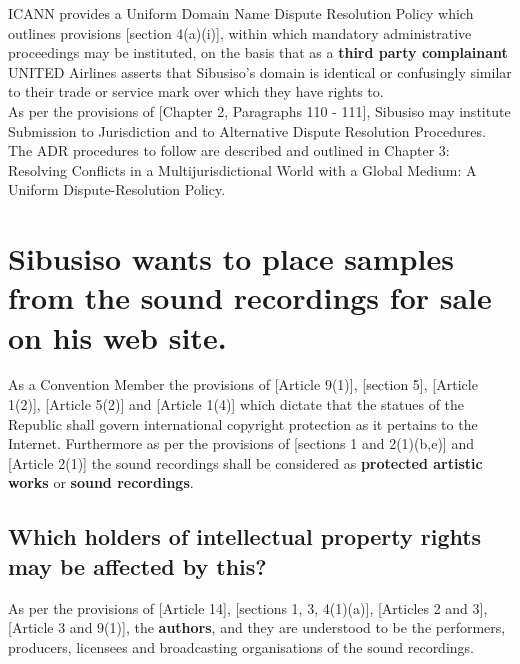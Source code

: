 \documentclass[11pt]{article}
\begin{document}
ICANN provides a Uniform Domain Name Dispute Resolution Policy which outlines
provisions [section 4(a)(i)]\cite{icann99_policy}, within which mandatory
administrative proceedings may be instituted, on the basis that as a \textbf{third
party complainant} UNITED Airlines asserts that Sibusiso's domain is identical
or confusingly similar to their trade or service mark over which they have
rights to.\\

As per the provisions of [Chapter 2, Paragraphs 110 -
111]\cite{wipo99_management_dns_ip_report}, Sibusiso may institute Submission to
Jurisdiction and to Alternative Dispute Resolution Procedures. The ADR procedures to
follow are described and outlined in Chapter 3: Resolving Conflicts in a
Multijurisdictional World with a Global Medium: A Uniform Dispute-Resolution
Policy.

\section{Sibusiso wants to place samples from the sound recordings for sale on his web site.}
\label{sec:orgf1a865a}
As a Convention Member the provisions of [Article 9(1)]\cite{wto17_trips},
[section 5]\cite{rsa78_copyrightact}, [Article 1(2)]\cite{eurlex00_elec_commerce},
[Article 5(2)]\cite{wipo86_berne} and [Article 1(4)]\cite{wipo96_copyright_treaty}
which dictate that the statues of the Republic shall govern international
copyright protection as it pertains to the Internet. Furthermore as per the
provisions of [sections 1 and 2(1)(b,e)]\cite{rsa78_copyrightact} and [Article
2(1)]\cite{wipo86_berne} the sound recordings shall be considered as \textbf{protected
artistic works} or \textbf{sound recordings}.

\subsection{Which holders of intellectual property rights may be affected by this?}
\label{sec:orgcee4ba3}

As per the provisions of [Article 14]\cite{wto17_trips}, [sections 1, 3,
4(1)(a)]\cite{rsa78_copyrightact}, [Articles 2 and 3]\cite{wipo96_wppt}, [Article 3
and 9(1)]\cite{wipo86_berne}, the \textbf{authors}, and they are understood to be the
performers, producers, licensees and broadcasting organisations of the sound
recordings.
\end{document}

